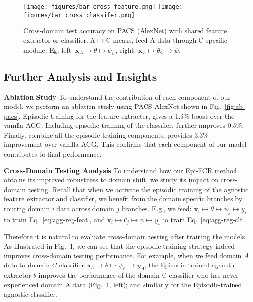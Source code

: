\documentclass[10pt,twocolumn,letterpaper]{article}
\newcommand{\keypoint}[1]{\vspace{0.1cm}\noindent\textbf{#1}\quad}
\newcommand{\cut}[1]{}
\begin{document}
\begin{figure}[t]
    \centering
\texttt{[image: figures/bar\_cross\_feature.png]}
\texttt{[image: figures/bar\_cross\_classifer.png]}
\vspace{-0.3cm}
    \caption{\small Cross-domain test accuracy on PACS (AlexNet) with shared feature extractor or classifier. A$\mapsto$C means, feed A data through C-specific module. Eg, left: $\mathbf{x}_A \mapsto \theta \mapsto \psi_{C}$, right: $\mathbf{x}_A \mapsto \theta_C \mapsto \psi$.}
    \label{fig:cross-domain-test-acc}
    \vspace{-0.3cm}
\end{figure}






\subsection{Further Analysis and Insights}
\keypoint{Ablation Study} To understand the contribution of each component of our model, we perform an ablation study using PACS-AlexNet shown in Fig.~\ref{fig:ab-pacs}. Episodic training for the feature extractor, gives a 1.6\% boost over the vanilla AGG. Including episodic training of the classifier, further improves 0.5\%. Finally, combine all the episodic training components, provides 3.3\% improvement over vanilla AGG. This confirms that each component of our model contributes to  final performance. 

\keypoint{Cross-Domain Testing Analysis} To understand how our Epi-FCR method obtains its improved robustness to domain shift, we study its impact on cross-domain testing. Recall that when we activate the episodic training of the agnostic feature extractor and classifier, we benefit from the domain specific branches by routing domain $i$ data across domain $j$ branches. E.g., we feed: $\mathbf{x}_i\mapsto \theta \mapsto \psi_j \mapsto y_i$ to train Eq.~\ref{eq:agg-reg-feat}, and $\mathbf{x}_i\mapsto \theta_j \mapsto \psi \mapsto y_i$ to train Eq.~\ref{eq:agg-reg-clf}. 

Therefore it is natural to evaluate cross-domain testing after training the models. As illustrated in Fig.~\ref{fig:cross-domain-test-acc}\cut{\footnote{To save space we only display the leave-photo-out split. The others are consistent with these observations.}}, we can see that the episodic training strategy indeed improves cross-domain testing performance. For example, when we feed domain $A$ data to domain $C$ classifier $\mathbf{x}_A\mapsto \theta \mapsto \psi_C \mapsto y_A$, the Episodic-trained agnostic extractor $\theta$ improves the performance of the domain-C classifier who has never experienced domain A data (Fig.~\ref{fig:cross-domain-test-acc}, left); and similarly for the Episodic-trained agnostic classifier.  
\end{document}
